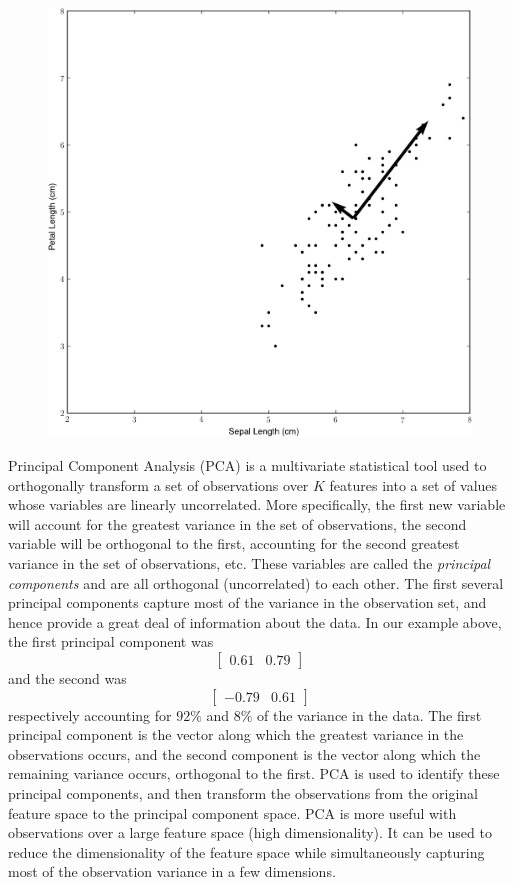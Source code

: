 \begin{figure}[h]
\centering
\includegraphics[width=\textwidth]{iris2.pdf}
\end{figure}

Principal Component Analysis (PCA) is a multivariate statistical tool used to orthogonally transform a set of observations over $K$ features into a set of values whose variables are linearly uncorrelated. More specifically, the first new variable will account for the greatest variance in the set of observations, the second variable will be orthogonal to the first, accounting for the second greatest variance in the set of observations, etc. These variables are called the \emph{principal components} and are all orthogonal (uncorrelated) to each other. The first several principal components capture most of the variance in the observation set, and hence provide a great deal of information about the data.
In our example above, the first principal component was \[\left[ \begin{array}{cc} 0.61 & 0.79 \end{array} \right] \]  and the second was \[\left[ \begin{array}{cc} -0.79 & 0.61 \end{array} \right] \] respectively accounting for $92\%$ and $8\%$ of the variance in the data. The first principal component is the vector along which the greatest variance in the observations occurs, and the second component is the vector along which the remaining variance occurs, orthogonal to the first. PCA is used to identify these principal components, and then transform the observations from the original feature space to the principal component space.
PCA is more useful with observations over a large feature space (high dimensionality). It can be used to reduce the dimensionality of the feature space while simultaneously capturing most of the observation variance in a few dimensions.

